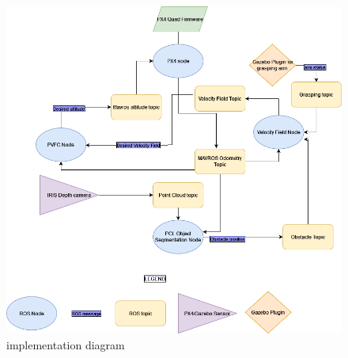 \begin{figure}[h!]
    \centering
    \includegraphics[width=\linewidth]{Images/implementation diagram.png}
    \caption{implementation diagram}
    \label{fig:implementationdiagram}
\end{figure}
\newpage
